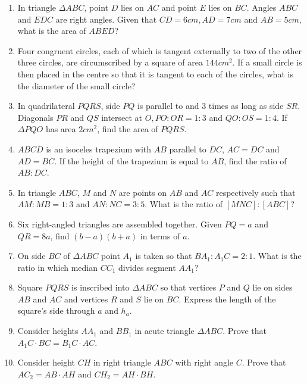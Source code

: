 \documentclass[letterpaper]{article}
\begin{document}
\begin{enumerate} 

\parskip5em

\item In triangle $\Delta ABC$, point $D$ lies on $AC$ and point $E$ lies on $BC$. Angles $ABC$ and $EDC$ are right angles. Given that $CD=6 cm, AD=7 cm$ and $AB=5 cm$, what is the area of $ABED$?

\item Four congruent circles, each of which is tangent externally to two of the other three circles, are circumscribed by a square of area $144 cm^2$. If a small circle is then placed in the centre so that it is tangent to each of the circles, what is the diameter of the small circle?

\item In quadrilateral $PQRS$, side $PQ$ is parallel to and 3 times as long as side $SR$. Diagonals $PR$ and $QS$ intersect at $O, PO:OR = 1:3$ and $QO:OS = 1:4$. If $\Delta PQO$ has area $2 cm^2$, find the area of $PQRS$.

\item $ABCD$ is an isoceles trapezium with $AB$ parallel to $DC$, $AC=DC$ and $AD=BC$. If the height of the trapezium is equal to $AB$, find the ratio of $AB:DC$.

\item In triangle $ABC$, $M$ and $N$ are points on $AB$ and $AC$ respectively such that $AM:MB = 1:3$ and $AN:NC = 3:5$. What is the ratio of $[MNC]:[ABC]$?

\item Six right-angled triangles are assembled together. Given $PQ=a$ and $QR=8a$, find $(b-a)(b+a)$ in terms of $a$.

\item On side $BC$ of $\Delta ABC$ point $A_1$ is taken so that $BA_1 : A_1C = 2 : 1$. What is the ratio in which median $CC_1$ divides segment $AA_1$?

\item Square $PQRS$ is inscribed into $\Delta ABC$ so that vertices $P$ and $Q$ lie on sides $AB$ and $AC$ and vertices $R$ and $S$ lie on $BC$. Express the length of the square’s side through $a$ and $h_a$.

\item Consider heights $AA_1$ and $BB_1$ in acute triangle $\Delta ABC$. Prove that $A_1C \cdot BC = B_1C \cdot AC$.

\item Consider height $CH$ in right triangle $ABC$ with right angle $C$. Prove that $AC_2 = AB \cdot AH$ and $CH_2 = AH \cdot BH$.


\end{enumerate}
\end{document}
